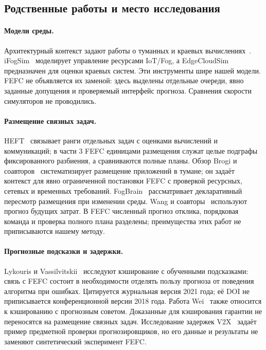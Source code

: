 \subsection{Родственные работы и место исследования}
\paragraph{Модели среды.}
Архитектурный контекст задают работы о туманных и краевых вычислениях~\cite{bonomi,shi}. iFogSim~\cite{ifogsim} моделирует управление ресурсами IoT/Fog, а EdgeCloudSim~\cite{edgecloudsim} предназначен для оценки краевых систем. Эти инструменты шире нашей модели. FEFC не объявляется их заменой: здесь выделены отдельные очереди, явно заданные допущения и проверяемый интерфейс прогноза. Сравнения скорости симуляторов не проводились.

\paragraph{Размещение связных задач.}
HEFT~\cite{heft} связывает ранги отдельных задач с оценками вычислений и коммуникаций; в части 3 FEFC единицами размещения служат целые подграфы фиксированного разбиения, а сравниваются полные планы. Обзор Brogi и соавторов~\cite{fogsurvey} систематизирует размещение приложений в тумане; он задаёт контекст для явно ограниченной постановки FEFC с проверкой ресурсных, сетевых и временных требований. FogBrain~\cite{fogbrain} рассматривает декларативный пересмотр размещения при изменении среды. Wang и соавторы~\cite{wang} используют прогноз будущих затрат. В FEFC численный прогноз отклика, порядковая команда и проверка полного плана разделены; преимущества этих работ не приписываются нашему методу.

\paragraph{Прогнозные подсказки и задержки.}
Lykouris и Vassilvitskii~\cite{lykouris} исследуют кэширование с обученными подсказками: связь с FEFC состоит в необходимости отделять пользу прогноза от поведения алгоритма при ошибках. Цитируется журнальная версия 2021 года; её DOI не приписывается конференционной версии 2018 года. Работа Wei~\cite{advice} также относится к кэшированию с прогнозным советом. Доказанные для кэширования гарантии не переносятся на размещение связных задач. Исследование задержек V2X~\cite{v2x} задаёт пример предметной проверки прогнозировщиков, но его данные и результаты не заменяют синтетический эксперимент FEFC.

